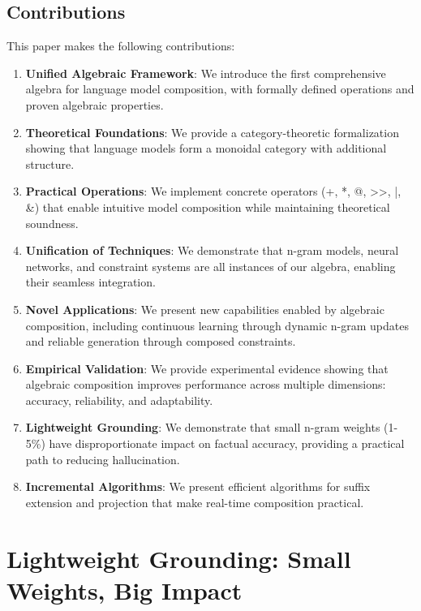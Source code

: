 \documentclass{article}
\theoremstyle{definition}
\begin{document}
\subsection{Contributions}

This paper makes the following contributions:

\begin{enumerate}
    \item \textbf{Unified Algebraic Framework}: We introduce the first comprehensive algebra for language model composition, with formally defined operations and proven algebraic properties.

    \item \textbf{Theoretical Foundations}: We provide a category-theoretic formalization showing that language models form a monoidal category with additional structure.

    \item \textbf{Practical Operations}: We implement concrete operators (+, *, @, >>, |, \&) that enable intuitive model composition while maintaining theoretical soundness.

    \item \textbf{Unification of Techniques}: We demonstrate that n-gram models, neural networks, and constraint systems are all instances of our algebra, enabling their seamless integration.

    \item \textbf{Novel Applications}: We present new capabilities enabled by algebraic composition, including continuous learning through dynamic n-gram updates and reliable generation through composed constraints.

    \item \textbf{Empirical Validation}: We provide experimental evidence showing that algebraic composition improves performance across multiple dimensions: accuracy, reliability, and adaptability.

    \item \textbf{Lightweight Grounding}: We demonstrate that small n-gram weights (1-5\%) have disproportionate impact on factual accuracy, providing a practical path to reducing hallucination.

    \item \textbf{Incremental Algorithms}: We present efficient algorithms for suffix extension and projection that make real-time composition practical.
\end{enumerate}

\section{Lightweight Grounding: Small Weights, Big Impact}
\end{document}
